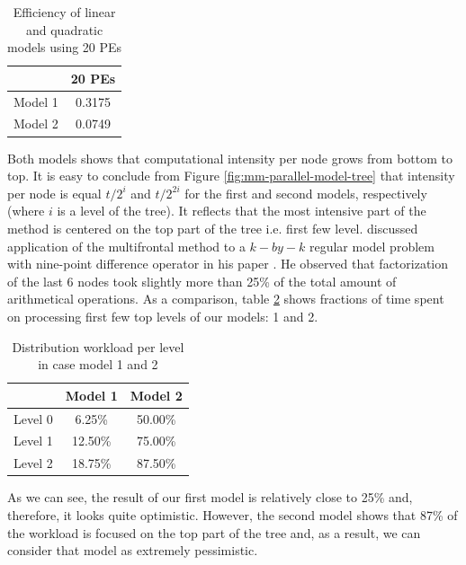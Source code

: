 \begin{table}[htpb]
\centering
\begin{tabular}{|c|c|}
\hline
        & 20 PEs \\ \hline
Model 1 & 0.3175 \\ \hline
Model 2 & 0.0749 \\ \hline
\end{tabular}
\caption{Efficiency of linear and quadratic models using 20 PEs}
\label{table:mm-model-efficiency-20-pe}
\end{table}


Both models shows that computational intensity per node grows from bottom to top. It is easy to conclude from Figure \ref{fig:mm-parallel-model-tree} that intensity per node is equal $t/2^{i}$ and $t/2^{2i}$ for the first and second models, respectively (where $i$ is a level of the tree). It reflects that the most intensive part of the method is centered on the top part of the tree i.e. first few level. \citeauthor{mult-frontal-original:2} discussed application of the multifrontal method to a $k-by-k$ regular model problem with nine-point difference operator in his paper \cite{mult-frontal-original:2}. He observed that factorization of the last 6 nodes took slightly more than 25\% of the total amount of arithmetical operations. As a comparison, table \ref{table:mm-simple-model-work-load} shows fractions of time spent on processing first few top levels of our models: 1 and 2.\\


\begin{table}[htpb]
\centering
\begin{tabular}{|c|c|c|}
\hline
        & Model 1 & Model 2 \\ \hline
Level 0 & 6.25\%  & 50.00\% \\ \hline
Level 1 & 12.50\% & 75.00\% \\ \hline
Level 2 & 18.75\% & 87.50\% \\ \hline

\end{tabular}
\caption{Distribution workload per level in case model 1 and 2}
\label{table:mm-simple-model-work-load}
\end{table}


As we can see, the result of our first model is relatively close to 25\% and, therefore, it looks quite optimistic. However, the second model shows that 87\% of the workload is focused on the top part of the tree and, as a result, we can consider that model as extremely pessimistic. \\


